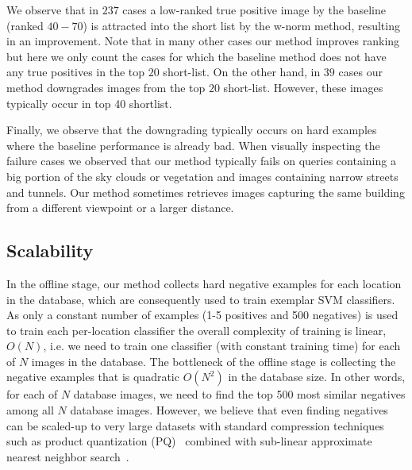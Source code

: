       We observe that in $237$ cases a low-ranked true positive image by the baseline (ranked $40-70$)  is attracted into the short list by the w-norm method, resulting in an improvement.  Note that in many other cases our method improves ranking but here we only count the cases for which the baseline method does not have any true positives in the top $20$ short-list. 
      \textcolor{petr}{On the other hand, in $39$ cases our method downgrades images from the top $20$ short-list. However, these images typically occur in top 40 shortlist.}

      Finally, we observe that \textcolor{petr} {the downgrading} typically occurs on hard examples where the baseline performance is already bad. 
      \textcolor{petr}{
        When visually inspecting the failure cases we observed that our method typically fails on queries containing a big portion of the sky clouds or vegetation and images containing narrow streets and tunnels. Our method sometimes retrieves images capturing the same building from a different viewpoint or a larger distance.
      }



  \subsection{{Scalability}}
  \label{sec:scalability}
    {
      In the offline stage, our method collects hard negative examples for each location in the database, which are consequently used to train exemplar SVM classifiers. 
      As only a constant number of examples (1-5 positives and 500 negatives) is used to train each per-location classifier the overall complexity of training is linear, $O(N)$, i.e. we need to train one classifier (with constant training time) for each of $N$ images in the database. The bottleneck of the offline stage is collecting the negative examples that is quadratic $O(N^2)$ in the database size. In other words, for each of $N$ database images, we need to find the top 500 most similar negatives among all $N$ database images.
      However, we believe that even finding negatives can be scaled-up to very large datasets with standard compression techniques such as product quantization (PQ)~\cite{Jegou11} combined with sub-linear approximate nearest neighbor search~\cite{Flann2014}.
    }

